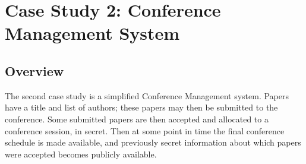 \section{Case Study 2: Conference Management System} \label{sect_cs_conf}

%
%
%
%
%
%
%
%
%
%
%
%
%
%

\subsection{Overview}

The second case study is a simplified Conference Management system. Papers have a title and list of authors; these papers may then be submitted to the conference. Some submitted papers are then accepted and allocated to a conference session, in secret. Then at some point in time the final conference schedule is made available, and previously secret information about which papers were accepted becomes publicly available.

